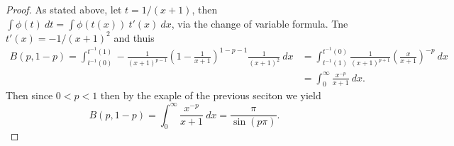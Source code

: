 \documentclass[11pt]{amsart}
\theoremstyle{definition}
\numberwithin{theorem}{section}
\numberwithin{definition}{section}
\numberwithin{equation}{section}
\newcommand{\parens}[1]{ \left( #1 \right) }
\begin{document}
\begin{proof}
	As stated above, let $t = 1/(x+1)$, then $\int \phi(t)\ dt = \int \phi(t(x))\ t'(x) \ dx$, via the change
	of variable formula. Tne $t'(x) = -1/(x+1)^2$ and thuis
	\begin{equation*}
	\begin{aligned}
		B(p, 1- p) = \int_{t^{-1}(0)}^{t^{-1}(1)} -\frac{1}{(x+1)^{p-1}}\parens{1 - \frac{1}{x+1}}^{1-p -1} \frac{1}{(x+1)^2}\ dx &= \int_{t^{-1}(1)}^{t^{-1}(0)} \frac{1}{(x+1)^{p+1}} \parens{\frac{x}{x+1}}^{-p}\ dx \\
		&= \int_0^\infty\frac{x^{-p}}{x+1}\ dx.
	\end{aligned}
	\end{equation*}
	Then since $0 < p < 1$ then by the exaple of the previous seciton we yield
	\begin{equation*}
	 	B(p, 1-p) = \int_0^\infty\frac{x^{-p}}{x+1}\ dx = \frac{\pi}{\sin(p \pi)}.
	 \end{equation*} 
\end{proof}






\end{document}

